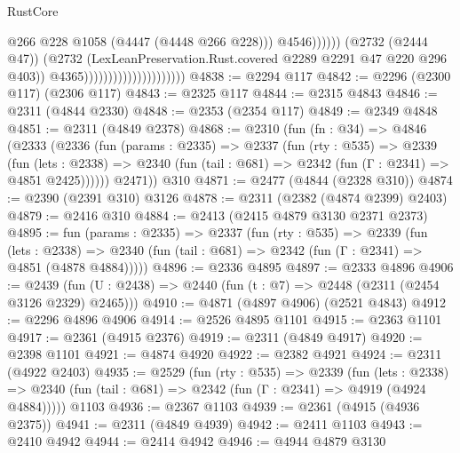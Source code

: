 \begin{lexlean}{RustCore}
\begin{coremodule}
                                                            @266
                                                            @228
                                                            @1058
                                                            (@4447 (@4448 @266 @228)))
                                                          @4546))))))
                                              (@2732 (@2444 @47))
                                              (@2732
                                                (LexLeanPreservation.Rust.covered
                                                  @2289
                                                  @2291
                                                  @47
                                                  @220
                                                  @296
                                                  @403))
                                              @4365)))))))))))))))))))))
@4838 := @2294 @117
@4842 := @2296 (@2300 @117) (@2306 @117)
@4843 := @2325 @117
@4844 := @2315 @4843
@4846 := @2311 (@4844 @2330)
@4848 := @2353 (@2354 @117)
@4849 := @2349 @4848
@4851 := @2311 (@4849 @2378)
@4868 := @2310
    (fun (fn : @34) =>
    @4846
      (@2333
        (@2336
          (fun (params : @2335) =>
          @2337
            (fun (rty : @535) =>
            @2339
              (fun (lets : @2338) =>
              @2340 (fun (tail : @681) => @2342 (fun (Γ : @2341) => @4851 @2425))))))
        @2471))
    @310
@4871 := @2477 (@4844 (@2328 @310))
@4874 := @2390 (@2391 @310) @3126
@4878 := @2311 (@2382 (@4874 @2399) @2403)
@4879 := @2416 @310
@4884 := @2413 (@2415 @4879 @3130 @2371 @2373)
@4895 := fun (params : @2335) =>
  @2337
    (fun (rty : @535) =>
    @2339
      (fun (lets : @2338) =>
      @2340 (fun (tail : @681) => @2342 (fun (Γ : @2341) => @4851 (@4878 @4884)))))
@4896 := @2336 @4895
@4897 := @2333 @4896
@4906 := @2439 (fun (U : @2438) => @2440 (fun (t : @7) => @2448 (@2311 (@2454 @3126 @2329) @2465)))
@4910 := @4871 (@4897 @4906) (@2521 @4843)
@4912 := @2296 @4896 @4906
@4914 := @2526 @4895 @1101
@4915 := @2363 @1101
@4917 := @2361 (@4915 @2376)
@4919 := @2311 (@4849 @4917)
@4920 := @2398 @1101
@4921 := @4874 @4920
@4922 := @2382 @4921
@4924 := @2311 (@4922 @2403)
@4935 := @2529
    (fun (rty : @535) =>
    @2339
      (fun (lets : @2338) =>
      @2340 (fun (tail : @681) => @2342 (fun (Γ : @2341) => @4919 (@4924 @4884)))))
    @1103
@4936 := @2367 @1103
@4939 := @2361 (@4915 (@4936 @2375))
@4941 := @2311 (@4849 @4939)
@4942 := @2411 @1103
@4943 := @2410 @4942
@4944 := @2414 @4942
@4946 := @4944 @4879 @3130

\end{coremodule}
\end{lexlean}
